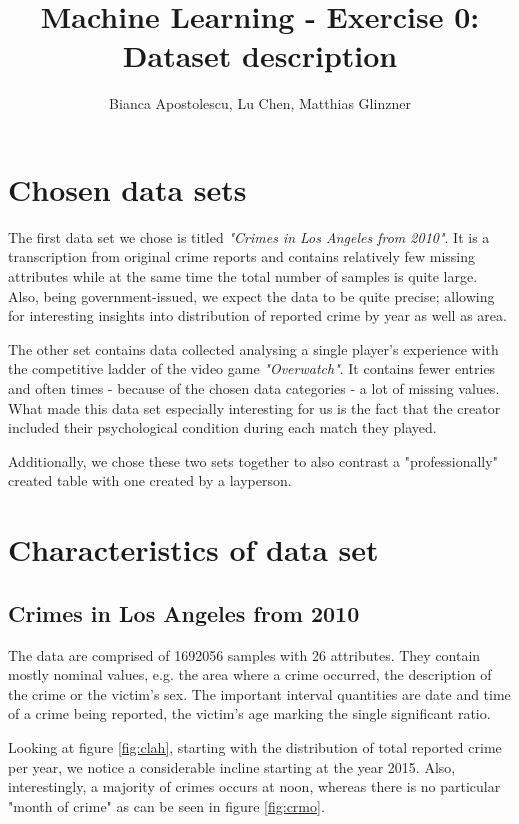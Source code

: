 \documentclass{article}
\begin{document}
\title{Machine Learning - Exercise 0: Dataset description}
\author{Bianca Apostolescu, Lu Chen, Matthias Glinzner}
\date{}
\maketitle

\section*{Chosen data sets}
The first data set we chose is titled \textit{"Crimes in Los Angeles from 2010"}.
It is a transcription from original crime reports and contains relatively few missing attributes while at the same time the total number of samples is quite large.
Also, being government-issued, we expect the data to be quite precise; allowing for interesting insights into distribution of reported crime by year as well as area.

The other set contains data collected analysing a single player's experience with the competitive ladder of the video game \textit{"Overwatch"}.
It contains fewer entries and often times - because of the chosen data categories - a lot of missing values.
What made this data set especially interesting for us is the fact that the creator included their psychological condition during each match they played.

Additionally, we chose these two sets together to also contrast a "professionally" created table with one created by a layperson.

\section*{Characteristics of data set}
\subsection*{Crimes in Los Angeles from 2010}
The data are comprised of 1692056 samples with 26 attributes.
They contain mostly nominal values, e.g. the area where a crime occurred, the description of the crime or the victim's sex.
The important interval quantities are date and time of a crime being reported, the victim's age marking the single significant ratio.

Looking at figure \ref{fig:clah}, starting with the distribution of total reported crime per year, we notice a considerable incline starting at the year 2015.
Also, interestingly, a majority of crimes occurs at noon, whereas there is no particular "month of crime" as can be seen in figure \ref{fig:crmo}.
\end{document}
